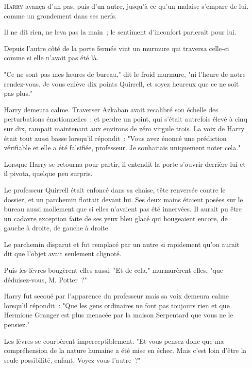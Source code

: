 
\lettrine{H}{arry} avança d'un pas, puis d'un autre, jusqu'à ce qu'un malaise s'empare de lui, comme un grondement dans ses nerfs.

Il ne dit rien, ne leva pas la main~; le sentiment d'inconfort parlerait pour lui.

Depuis l'autre côté de la porte fermée vint un murmure qui traversa celle-ci comme si elle n'avait pas été là.

"Ce ne sont pas mes heures de bureau," dit le froid murmure, "ni l'heure de notre rendez-vous. Je vous enlève dix points Quirrell, et soyez heureux que ce ne soit pas plus."

Harry demeura calme. Traverser Azkaban avait recalibré son échelle des perturbations émotionnelles~; et perdre un point, qui s'était autrefois élevé à cinq sur dix, rampait maintenant aux environs de zéro virgule trois. La voix de Harry était tout aussi basse lorsqu'il répondit~: "Vous avez énoncé une prédiction vérifiable et elle a été falsifiée, professeur. Je souhaitais uniquement noter cela."

Lorsque Harry se retourna pour partir, il entendit la porte s'ouvrir derrière lui et il pivota, quelque peu surpris.

Le professeur Quirrell était enfoncé dans sa chaise, tête renversée contre le dossier, et un parchemin flottait devant lui. Ses deux mains étaient posées sur le bureau aussi mollement que si elles n'avaient pas été innervées. Il aurait pu être un cadavre exception faite de ses yeux bleu glacé qui bougeaient encore, de gauche à droite, de gauche à droite.

Le parchemin disparut et fut remplacé par un autre si rapidement qu'on aurait dit que l'objet avait seulement clignoté.

Puis les lèvres bougèrent elles aussi. "Et de cela," murmurèrent-elles, "que déduisez-vous, M. Potter~?"

Harry fut secoué par l'apparence du professeur mais sa voix demeura calme lorsqu'il répondit~: "Que les gens ordinaires ne font pas toujours rien et que Hermione Granger est plus menacée par la maison Serpentard que vous ne le pensiez."

Les lèvres se courbèrent imperceptiblement. "Et vous pensez donc que ma compréhension de la nature humaine a été mise en échec. Mais c'est loin d'être la seule possibilité, enfant. Voyez-vous l'autre~?"

